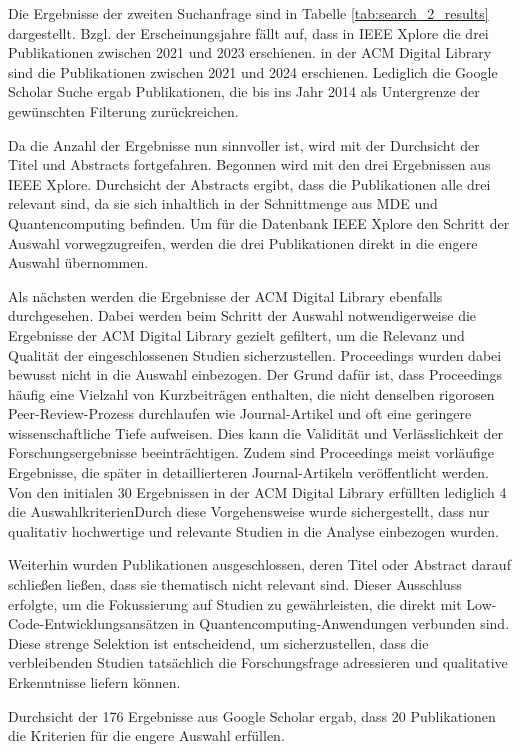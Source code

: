 Die Ergebnisse der zweiten Suchanfrage sind in Tabelle \ref{tab:search_2_results} dargestellt. Bzgl. der Erscheinungsjahre fällt auf, dass in 
IEEE Xplore die drei Publikationen zwischen 2021 und 2023 erschienen. in der ACM Digital Library sind die Publikationen zwischen 2021 und 2024 erschienen. 
Lediglich die Google Scholar Suche ergab Publikationen, die bis ins Jahr 2014 als Untergrenze der gewünschten Filterung zurückreichen. 

Da die Anzahl der Ergebnisse nun sinnvoller ist, wird mit der Durchsicht der Titel und Abstracts fortgefahren. 
Begonnen wird mit den drei Ergebnissen aus IEEE Xplore. Durchsicht der Abstracts ergibt, dass die Publikationen 
alle drei relevant sind, da sie sich inhaltlich in der Schnittmenge aus MDE und Quantencomputing befinden. 
Um für die Datenbank IEEE Xplore den Schritt der Auswahl vorwegzugreifen, werden die drei Publikationen 
direkt in die engere Auswahl übernommen. 

Als nächsten werden die Ergebnisse der ACM Digital Library ebenfalls durchgesehen. Dabei werden beim Schritt der Auswahl notwendigerweise die 
Ergebnisse der ACM Digital Library gezielt gefiltert, um die Relevanz und Qualität der eingeschlossenen Studien sicherzustellen. 
Proceedings wurden dabei bewusst nicht in die Auswahl einbezogen. Der Grund dafür ist, dass Proceedings häufig eine 
Vielzahl von Kurzbeiträgen enthalten, die nicht denselben rigorosen Peer-Review-Prozess durchlaufen wie Journal-Artikel 
und oft eine geringere wissenschaftliche Tiefe aufweisen. Dies kann die Validität und Verlässlichkeit der 
Forschungsergebnisse beeinträchtigen. Zudem sind Proceedings meist vorläufige Ergebnisse, die 
später in detaillierteren Journal-Artikeln veröffentlicht werden. Von den initialen 30 Ergebnissen 
in der ACM Digital Library erfüllten lediglich 4 die AuswahlkriterienDurch diese Vorgehensweise wurde 
sichergestellt, dass nur qualitativ hochwertige und relevante Studien in die Analyse einbezogen wurden.

Weiterhin wurden Publikationen ausgeschlossen, deren Titel oder Abstract darauf schließen ließen, dass sie thematisch 
nicht relevant sind. Dieser Ausschluss erfolgte, um die Fokussierung auf Studien zu gewährleisten, die direkt mit 
Low-Code-Entwicklungsansätzen in Quantencomputing-Anwendungen verbunden sind. Diese strenge Selektion ist entscheidend, um 
sicherzustellen, dass die verbleibenden Studien tatsächlich die Forschungsfrage adressieren und qualitative Erkenntnisse liefern können. 

Durchsicht der 176 Ergebnisse aus Google Scholar ergab, dass 20 Publikationen die Kriterien für die engere Auswahl erfüllen. 

